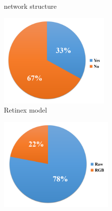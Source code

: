 \documentclass[letterpaper,12pt]{article}
\begin{document}
\begin{figure}[htbp]
\begin{subfigure}{0.2\textwidth}
			\captionsetup{font=scriptsize}
			\caption{network structure}
			\label{fig:subfig_b}
		\end{subfigure}
		\begin{subfigure}{0.2\textwidth}
			\includegraphics[width=\linewidth]{Retinex_model}
			\captionsetup{font=scriptsize}
			\caption{Retinex model}
			\label{fig:subfig_c}	
		\end{subfigure}
		\begin{subfigure}{0.2\textwidth}
			\includegraphics[width=\linewidth]{data_format}
			\captionsetup{font=scriptsize}

\end{subfigure}
\end{figure}
\end{document}
